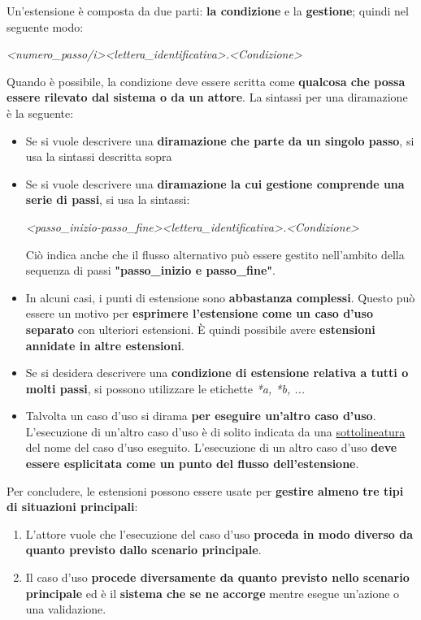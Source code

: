 \documentclass[12pt]{article}
\begin{document}
\begin{itemize}
    Un'estensione è composta da due parti: \textbf{la condizione} e la \textbf{gestione}; quindi nel seguente modo:
    \begin{center}
        \textit{<numero\_passo/i><lettera\_identificativa>.<Condizione>}
    \end{center}
    Quando è possibile, la condizione deve essere scritta come \textbf{qualcosa che possa essere rilevato dal sistema o da un attore}.
    La sintassi per una diramazione è la seguente:
    \begin{itemize}
        \item Se si vuole descrivere una \textbf{diramazione che parte da un singolo passo}, si usa la sintassi descritta sopra
        \item Se si vuole descrivere una \textbf{diramazione la cui gestione comprende una serie di passi}, si usa la sintassi:
        \begin{center}
            \textit{<passo\_inizio-passo\_fine><lettera\_identificativa>.<Condizione>}
        \end{center}
        Ciò indica anche che il flusso alternativo può essere gestito nell'ambito della sequenza di passi \textbf{"passo\_inizio e passo\_fine"}.
        \item In alcuni casi, i punti di estensione sono \textbf{abbastanza complessi}. Questo può essere un motivo per \textbf{esprimere l'estensione come un caso d'uso separato} con ulteriori estensioni.
        È quindi possibile avere \textbf{estensioni annidate in altre estensioni}.
        \item Se si desidera descrivere una \textbf{condizione di estensione relativa a tutti o molti passi}, si possono utilizzare le etichette \textit{*a, *b, ...}
        \item Talvolta un caso d'uso si dirama \textbf{per eseguire un'altro caso d'uso}. L'esecuzione di un'altro caso d'uso è di solito indicata da una \underline{sottolineatura} del nome del caso d'uso eseguito.
        L'esecuzione di un altro caso d'uso \textbf{deve essere esplicitata come un punto del flusso dell'estensione}.
    \end{itemize}
    Per concludere, le estensioni possono essere usate per \textbf{gestire almeno tre tipi di situazioni principali}:\
    \begin{enumerate}
        \item L'attore vuole che l'esecuzione del caso d'uso \textbf{proceda in modo diverso da quanto previsto dallo scenario principale}.
        \item Il caso d'uso \textbf{procede diversamente da quanto previsto nello scenario principale} ed è il \textbf{sistema che se ne accorge} mentre esegue un'azione o una validazione.

\end{enumerate}
\end{itemize}
\end{document}

